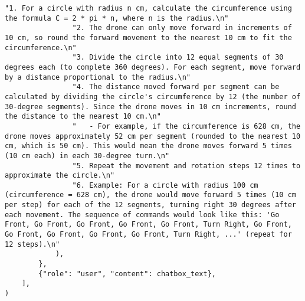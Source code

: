 \begin{lstlisting}[caption={Prompt Engineering Drone Command Generation}, label={lst:prompt_engineering}]
                "1. For a circle with radius n cm, calculate the circumference using the formula C = 2 * pi * n, where n is the radius.\n"
                "2. The drone can only move forward in increments of 10 cm, so round the forward movement to the nearest 10 cm to fit the circumference.\n"
                "3. Divide the circle into 12 equal segments of 30 degrees each (to complete 360 degrees). For each segment, move forward by a distance proportional to the radius.\n"
                "4. The distance moved forward per segment can be calculated by dividing the circle's circumference by 12 (the number of 30-degree segments). Since the drone moves in 10 cm increments, round the distance to the nearest 10 cm.\n"
                "   - For example, if the circumference is 628 cm, the drone moves approximately 52 cm per segment (rounded to the nearest 10 cm, which is 50 cm). This would mean the drone moves forward 5 times (10 cm each) in each 30-degree turn.\n"
                "5. Repeat the movement and rotation steps 12 times to approximate the circle.\n"
                "6. Example: For a circle with radius 100 cm (circumference = 628 cm), the drone would move forward 5 times (10 cm per step) for each of the 12 segments, turning right 30 degrees after each movement. The sequence of commands would look like this: 'Go Front, Go Front, Go Front, Go Front, Go Front, Turn Right, Go Front, Go Front, Go Front, Go Front, Go Front, Turn Right, ...' (repeat for 12 steps).\n"
            ),
        },
        {"role": "user", "content": chatbox_text},
    ],
)
\end{lstlisting}